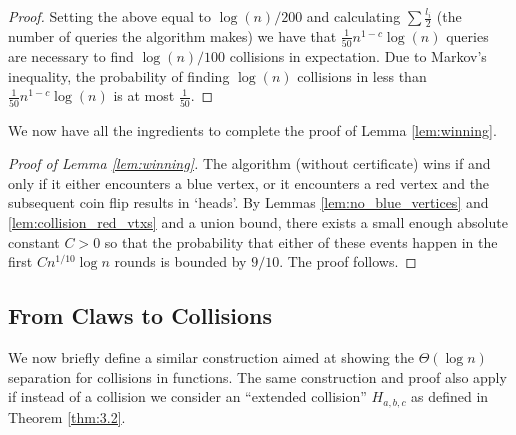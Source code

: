\documentclass[11pt]{article}
\numberwithin{equation}{section}
\newcommand{\1}{\mathbf{1}}
\begin{document}
\begin{proof}
Setting the above equal to $\log(n)/200$ and calculating $\sum \frac{l_i}{2}$ (the number of queries the algorithm makes) we have that $\frac{1}{50}n^{1-c} \log(n)$ queries are necessary to find $\log(n)/100$ collisions in expectation. Due to Markov's inequality, the probability of finding $\log(n)$ collisions in less than $\frac{1}{50}n^{1-c} \log(n)$ is at most $\frac{1}{50}$.
















\end{proof}
\fi
We now have all the ingredients to complete the proof of Lemma \ref{lem:winning}.

\begin{proof}[Proof of Lemma \ref{lem:winning}]
The algorithm (without certificate) wins if and only if it either encounters a blue vertex, or it encounters a red vertex and the subsequent coin flip results in `heads'. By Lemmas \ref{lem:no_blue_vertices} and \ref{lem:collision_red_vtxs} and a union bound, there exists a small enough absolute constant $C >0$ so that the probability that either of these events happen in the first $C n^{1/10} \log n$ rounds is bounded by $9/10$. The proof follows.
\end{proof}


\subsection{From Claws to Collisions \label{sec:clawstocollision}}
We now briefly define a similar construction aimed at showing the $\Theta(\log n)$ separation for collisions in functions. The same construction and proof also apply if instead of a collision we consider  an ``extended collision'' $H_{a,b,c}$ as defined in Theorem \ref{thm:3.2}.
\end{document}
